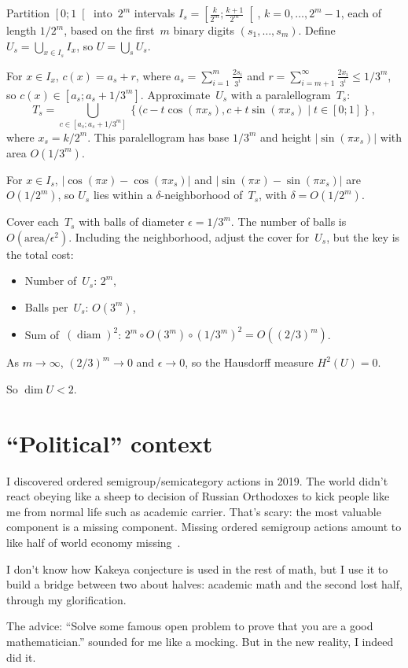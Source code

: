 \documentclass[oneside,draft]{amsart}
\newcommand{\setcond}[2]{\left\{#1\mid#2\right\}}
\newcommand{\diam}{\operatorname{diam}}
\begin{document}
Partition $\left[0;1\right[$ into~$2^m$ intervals $I_s=\left[\frac{k}{2^m};\frac{k+1}{2^m}\right[$, $k=0,\ldots,2^m-1$, each of length $1/2^m$, based on the first~$m$ binary digits $(s_1,\ldots,s_m)$. Define $U_s=\bigcup_{x\in I_s} I_x$, so $U=\bigcup_s U_s$.

For $x\in I_x$, $c(x)=a_s+r$, where $a_s=\sum_{i=1}^m \frac{2s_i}{3^i}$ and $r=\sum_{i=m+1}^\infty \frac{2x_i}{3^i}\leq 1/3^m$, so $c(x)\in[a_s;a_s+1/3^m]$. Approximate~$U_s$ with a paralellogram~$T_s$:
\[
T_s = \bigcup_{c\in[a_s;a_s+1/3^m]} \setcond{(c-t\cos(\pi x_s), c+t\sin(\pi x_s)}{t\in[0;1]},
\]
where $x_s=k/2^m$. This paralellogram has base $1/3^m$ and height $\lvert\sin(\pi x_s)\rvert$ with area $O(1/3^m)$.

For $x\in I_s$, $\lvert\cos(\pi x)-\cos(\pi x_s)\rvert$ and $\lvert\sin(\pi x)-\sin(\pi x_s)\rvert$ are $O(1/2^m)$, so $U_s$ lies within a $\delta$-neigh\-bor\-hood of~$T_s$, with $\delta=O(1/2^m)$.

Cover each~$T_s$ with balls of diameter $\epsilon=1/3^m$. The number of balls is $O(\mathrm{area}/\epsilon^2)$. Including the neighborhood, adjust the cover for~$U_s$, but the key is the total cost:

\begin{itemize}
\item Number of~$U_s$: $2^m$,
\item Balls per~$U_s$: $O(3^m)$,
\item Sum of~$(\diam)^2$: $2^m\circ O(3^m)\circ(1/3^m)^2=O((2/3)^m)$.
\end{itemize}

As $m\to\infty$, $(2/3)^m\to 0$ and $\epsilon\to 0$, so the Hausdorff measure $H^2(U)=0$.

So $\dim U<2$.

\section{``Political'' context}

I discovered ordered semigroup/semicategory actions in 2019. The world didn't react obeying like a sheep to decision of Russian Orthodoxes to kick people like me from normal life such as academic carrier. That's scary: the most valuable component is a missing component. Missing ordered semigroup actions amount to like half of world economy missing~\cite{osa-important}.

I don't know how Kakeya conjecture is used in the rest of math, but I use it to build a bridge between two about halves: academic math and the second lost half, through my glorification.

The advice: ``Solve some famous open problem to prove that you are a good mathematician.'' sounded for me like a mocking. But in the new reality, I indeed did it.



\end{document}
